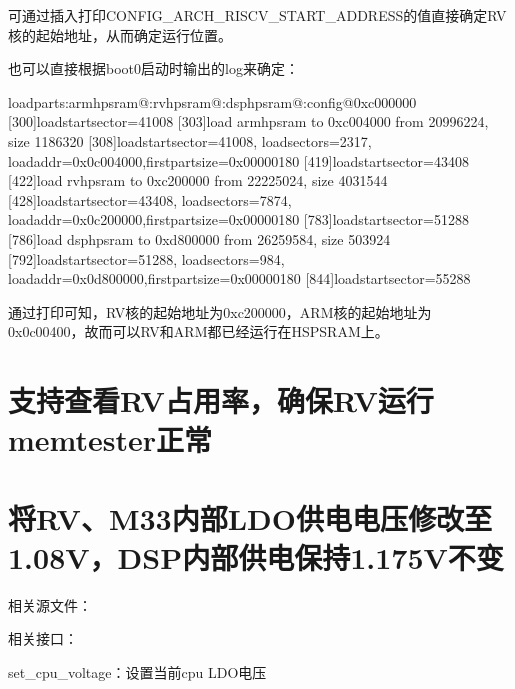 \documentclass[letterpaper,10pt,english]{sphinxmanual}
\begin{document}
\sphinxAtStartPar
可通过插入打印CONFIG\_ARCH\_RISCV\_START\_ADDRESS的值直接确定RV核的起始地址，从而确定运行位置。

\sphinxAtStartPar
也可以直接根据boot0启动时输出的log来确定：

\begin{sphinxVerbatim}[commandchars=\\\{\}]
[294]loadparts:arm\PYGZhy{}hpsram@:rv\PYGZhy{}hpsram@:dsp\PYGZhy{}hpsram@:config@0xc000000
[300]load\PYGZus{}start\PYGZus{}sector=41008
[303]load arm\PYGZhy{}hpsram to 0xc004000 from 20996224, size 1186320
[308]load\PYGZus{}start\PYGZus{}sector=41008, load\PYGZus{}sectors=2317, loadaddr=0x0c004000,first\PYGZus{}part\PYGZus{}size=0x00000180
[419]load\PYGZus{}start\PYGZus{}sector=43408
[422]load rv\PYGZhy{}hpsram to 0xc200000 from 22225024, size 4031544
[428]load\PYGZus{}start\PYGZus{}sector=43408, load\PYGZus{}sectors=7874, loadaddr=0x0c200000,first\PYGZus{}part\PYGZus{}size=0x00000180
[783]load\PYGZus{}start\PYGZus{}sector=51288
[786]load dsp\PYGZhy{}hpsram to 0xd800000 from 26259584, size 503924
[792]load\PYGZus{}start\PYGZus{}sector=51288, load\PYGZus{}sectors=984, loadaddr=0x0d800000,first\PYGZus{}part\PYGZus{}size=0x00000180
[844]load\PYGZus{}start\PYGZus{}sector=55288
\end{sphinxVerbatim}

\sphinxAtStartPar
通过打印可知，RV核的起始地址为0xc200000，ARM核的起始地址为 0x0c00400，故而可以RV和ARM都已经运行在HS\sphinxhyphen{}PSRAM上。


\section{支持查看RV占用率，确保RV运行memtester正常}
\label{\detokenize{r128_u9a8c_u8bc1_u56fa_u4ef6/r128_u9a8c_u8bc1_u56fa_u4ef6_u5f00_u53d1_u6307_u5357:rv-rvmemtester}}

\section{将RV、M33内部LDO供电电压修改至1.08V，DSP内部供电保持1.175V不变}
\label{\detokenize{r128_u9a8c_u8bc1_u56fa_u4ef6/r128_u9a8c_u8bc1_u56fa_u4ef6_u5f00_u53d1_u6307_u5357:rvm33ldo1-08v-dsp1-175v}}
\sphinxAtStartPar
相关源文件：

\sphinxAtStartPar
相关接口：

\sphinxAtStartPar
set\_cpu\_voltage：设置当前cpu LDO电压
\end{document}
